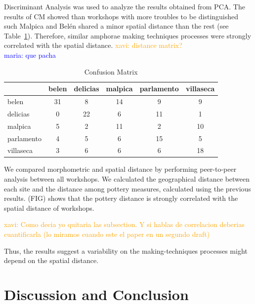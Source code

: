 \documentclass[review]{elsarticle}
\newcommand{\memo}[2]{\textcolor{#1}{#2}}
\newcommand{\xavi}[1]{\memo{orange}{xavi: #1\\}}
\newcommand{\maria}[1]{\memo{blue}{maria: #1\\}}
\begin{document}
Discriminant Analysis was used to analyze the results obtained from PCA. The results of CM showed than workshops with more troubles to be distinguished such Malpica and Bel\'en shared a minor spatial distance than the rest (see Table~\ref{table:confusion}). Therefore, similar amphorae making techniques processes were strongly correlated with the spatial distance. 
\xavi{distance matrix?}
\maria{que pacha}

\begin{table}[htp]
\begin{tabular}{lccccc}
\hline
 & belen & delicias & malpica & parlamento & villaseca\\ \hline
belen & 31 &       8 &      14 &          9 &          9 \\
delicias       & 0 &        22 &       6&         11&         1 \\
malpica &       5  &     2  &    11   &       2  &      10 \\
parlamento &     4  &      5 &      6 &        15 &        5\\
villaseca   &   3   &     6   &    6  &        6  &     18 \\
\hline

\end{tabular}
\caption{Confusion Matrix}
\label{table:confusion}
\end{table}


We compared morphometric and spatial distance by performing peer-to-peer analysis between all workshops. We calculated the geographical distance between each site and the distance among pottery measures, calculated using the previous results. (FIG) shows that the pottery distance is strongly correlated with the spatial distance of workshops.


\xavi{Como decia yo quitaria las subsection. Y si hablas de correlacion deberias cuantificarla (lo miramos cuando este el paper en un segundo draft)}



Thus, the results suggest a variability on the making-techniques processes might depend on the spatial distance.  

\section{Discussion and Conclusion}
\end{document}

